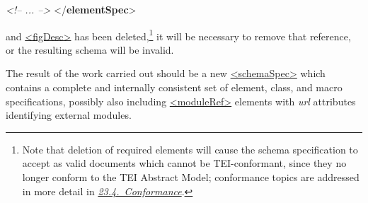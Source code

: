 \begin{shaded}
\hspace*{1em}\hspace*{1em}\mbox{}\newline 
\hspace*{1em}\hspace*{1em}\mbox{}\newline 
\hspace*{1em}\hspace*{1em}\mbox{}\newline 
\hspace*{1em}\mbox{}\newline 
{}\mbox{}\newline 
\textit{<!-- ... -->}\mbox{}\newline 
{</\textbf{elementSpec}>}\end{shaded}\egroup\par \noindent  and \hyperref[TEI.figDesc]{<figDesc>} has been deleted,\footnote{Note that deletion of required elements will cause the schema specification to accept as valid documents which cannot be TEI-conformant, since they no longer conform to the TEI Abstract Model; conformance topics are addressed in more detail in \textit{\hyperref[CF]{23.4.\ Conformance}}.} it will be necessary to remove that reference, or the resulting schema will be invalid.\par
The result of the work carried out should be a new \hyperref[TEI.schemaSpec]{<schemaSpec>} which contains a complete and internally consistent set of element, class, and macro specifications, possibly also including \hyperref[TEI.moduleRef]{<moduleRef>} elements with {\itshape url} attributes identifying external modules.
